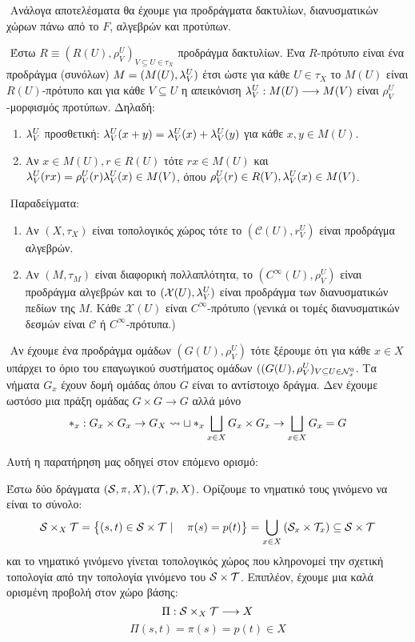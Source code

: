 $ $\newline
Ανάλογα αποτελέσματα θα έχουμε για προδράγματα δακτυλίων, διανυσματικών χώρων πάνω από το $F$, αλγεβρών και προτύπων.


$ $\newline
Έστω $R\equiv (R(U),\rho^U_V)_{V\subseteq U \in \tau_X}$ προδράγμα δακτυλίων. Ένα $R$-πρότυπο είναι ένα προδράγμα (συνόλων) $M = (M(U),\lambda^U_V)$ έτσι ώστε για κάθε $U \in \tau_X$ το $M(U)$ είναι $R(U)$-πρότυπο και για κάθε $V\subseteq U$ η απεικόνιση $\lambda^U_V:M(U)\longrightarrow M(V)$ είναι $\rho^U_V$-μορφισμός προτύπων. Δηλαδή:
\begin{enumerate}
    \item $\lambda^U_V$ προσθετική: $\lambda^U_V (x+y) = \lambda^U_V (x) + \lambda^U_V (y)$ για κάθε $x,y \in M(U)$.
    \item Αν $x \in M(U), r \in R(U)$ τότε $rx \in M(U)$ και $\lambda^U_V (rx) = \rho^U_V(r) \lambda^U_V(x) \in M(V)$, όπου $\rho^U_V(r) \in R(V), \lambda^U_V (x) \in M(V)$.
\end{enumerate}

$ $\newline
Παραδείγματα:

\begin{enumerate}
    \item Αν $(X,\tau_X)$ είναι τοπολογικός χώρος τότε το $(\mathcal{C}(U),r^U_V)$ είναι προδράγμα αλγεβρών.
    \item Αν $(M,\tau_M)$ είναι διαφορική πολλαπλότητα, το $(C^{\infty}(U),\rho^U_V)$ είναι προδράγμα αλγεβρών και το $(\mathcal{X}(U),\lambda^U_V)$ είναι προδράγμα των διανυσματικών πεδίων της $M$. Κάθε $\mathcal{X}(U)$ είναι $C^{\infty}$-πρότυπο (γενικά οι τομές διανυσματικών δεσμών είναι $\mathcal{C}$ ή $C^{\infty}$-πρότυπα.)
\end{enumerate}


$ $\newline
Αν έχουμε ένα προδράγμα ομάδων $(G(U),\rho^U_V)$ τότε ξέρουμε ότι για κάθε $x \in X$ υπάρχει το όριο του επαγωγικού συστήματος ομάδων $((G(U),\rho^U_V)_{V\subseteq U \in \mathcal{N}^0_x}$. Τα νήματα $G_x$ έχουν δομή ομάδας όπου $G$ είναι το αντίστοιχο δράγμα. Δεν έχουμε ωστόσο μια πράξη ομάδας $G\times G\rightarrow G$ αλλά μόνο 
$$*_x : G_x \times G_x \rightarrow G_X \mathrel{\leadsto} \sqcup *_x \bigsqcup\limits_{x \in X} G_x \times G_x \rightarrow \bigsqcup\limits_{x \in X}G_x = G$$

\noindent Αυτή η παρατήρηση μας οδηγεί στον επόμενο ορισμό:

\begin{defn}
    Έστω δύο δράγματα $(\mathcal{S}, \pi, X), (\mathcal{T},p,X)$. Ορίζουμε το νηματικό τους γινόμενο να είναι το σύνολο:
    $$\mathcal{S} \times_X \mathcal{T} = \big\{ (s,t) \in \mathcal{S} \times \mathcal{T}\mid \quad \pi(s) = p(t)\big\} = \bigcup\limits_{x \in X} \left(\mathcal{S}_x \times \mathcal{T}_x \right) \subseteq \mathcal{S} \times \mathcal{T}$$ και το νηματικό γινόμενο γίνεται τοπολογικός χώρος που κληρονομεί την σχετική τοπολογία από την τοπολογία γινόμενο του $\mathcal{S} \times \mathcal{T}$. Επιπλέον, έχουμε μια καλά ορισμένη προβολή στον χώρο βάσης:
    $$\Pi :\mathcal{S} \times_X \mathcal{T} \longrightarrow X$$
    $$\Pi(s,t) = \pi (s) = p(t) \in X$$
\end{defn}

